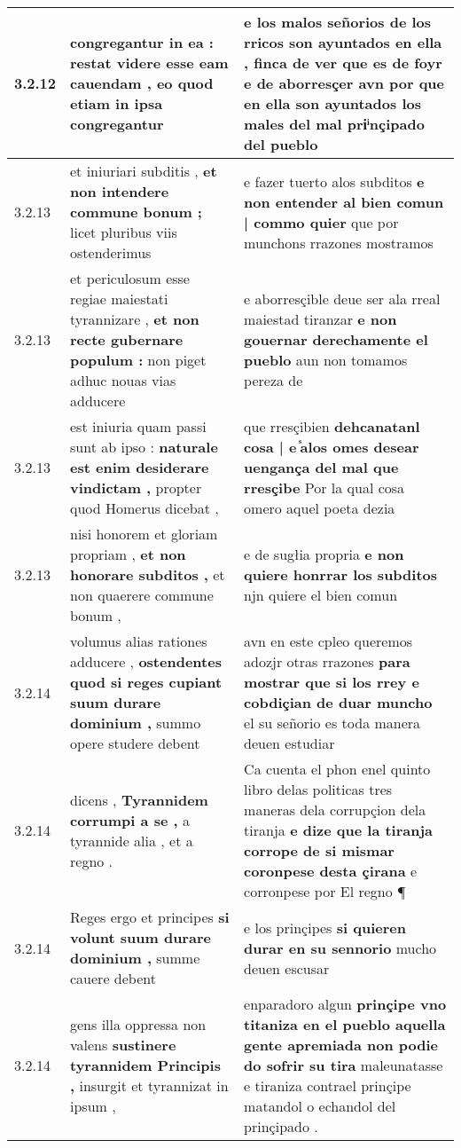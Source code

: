 \begin{tabular}{|p{1cm}|p{6.5cm}|p{6.5cm}|}
3.2.12 & congregantur in ea : \textbf{ restat videre esse eam cauendam , } eo quod etiam in ipsa congregantur & e los malos señorios de los rricos son ayuntados en ella , \textbf{ finca de ver que es de foyr e de aborresçer avn } por que en ella son ayuntados los males del mal priͥnçipado del pueblo \\\hline
3.2.13 & et iniuriari subditis , \textbf{ et non intendere commune bonum ; } licet pluribus viis ostenderimus & e fazer tuerto alos subditos \textbf{ e non entender al bien comun | commo quier } que por munchons rrazones mostramos \\\hline
3.2.13 & et periculosum esse regiae maiestati tyrannizare , \textbf{ et non recte gubernare populum : } non piget adhuc nouas vias adducere & e aborresçible deue ser ala rreal maiestad tiranzar \textbf{ e non gouernar derechamente el pueblo } aun non tomamos pereza de \\\hline
3.2.13 & est iniuria quam passi sunt ab ipso : \textbf{ naturale est enim desiderare vindictam , } propter quod Homerus dicebat , & que rresçibien \textbf{ dehcanatanl cosa | e ᷤalos omes desear uengança del mal que rresçibe } Por la qual cosa omero aquel poeta dezia \\\hline
3.2.13 & nisi honorem et gloriam propriam , \textbf{ et non honorare subditos , } et non quaerere commune bonum , & e de sugłia propria \textbf{ e non quiere honrrar los subditos } njn quiere el bien comun \\\hline
3.2.14 & volumus alias rationes adducere , \textbf{ ostendentes quod si reges cupiant suum durare dominium , } summo opere studere debent & avn en este cpleo queremos adozjr otras rrazones \textbf{ para mostrar que si los rrey e cobdiçian de duar muncho } el su señorio es toda manera deuen estudiar \\\hline
3.2.14 & dicens , \textbf{ Tyrannidem corrumpi a se , } a tyrannide alia , et a regno . & Ca cuenta el phon enel quinto libro delas politicas tres maneras dela corrupçion dela tiranja \textbf{ e dize que la tiranja corrope de si mismar coronpese desta çirana } e corronpese por El regno ¶ \\\hline
3.2.14 & Reges ergo et principes \textbf{ si volunt suum durare dominium , } summe cauere debent & e los prinçipes \textbf{ si quieren durar en su sennorio } mucho deuen escusar \\\hline
3.2.14 & gens illa oppressa non valens \textbf{ sustinere tyrannidem Principis , } insurgit et tyrannizat in ipsum , & enparadoro algun \textbf{ prinçipe vno titaniza en el pueblo aquella gente apremiada non podie do sofrir su tira } maleunatasse e tiraniza contrael prinçipe matandol o echandol del prinçipado . \\\hline

\end{tabular}
